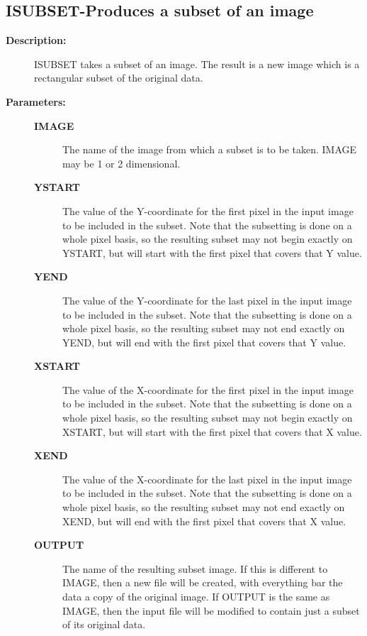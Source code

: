 \subsection{ISUBSET-\label{ISUBSET}Produces a subset of an image}
\begin{description}

\item [{\bf Description:}]
 ISUBSET takes a subset of an image.  The result is a new image
 which is a rectangular subset of the original data.

\item [{\bf Parameters:}]
\begin{description}
\item [{\bf IMAGE}]
 The name of the image from which a subset
 is to be taken.  IMAGE may be 1 or 2 dimensional.
\item [{\bf YSTART}]
 The value of the Y-coordinate for the first
 pixel in the input image to be included in the subset.
 Note that the subsetting is done on a whole pixel basis,
 so the resulting subset may not begin exactly on YSTART,
 but will start with the first pixel that covers that
 Y value.
\item [{\bf YEND}]
 The value of the Y-coordinate for the last
 pixel in the input image to be included in the subset.
 Note that the subsetting is done on a whole pixel basis,
 so the resulting subset may not end exactly on YEND,
 but will end with the first pixel that covers that
 Y value.
\item [{\bf XSTART}]
 The value of the X-coordinate for the first
 pixel in the input image to be included in the subset.
 Note that the subsetting is done on a whole pixel basis,
 so the resulting subset may not begin exactly on XSTART,
 but will start with the first pixel that covers that
 X value.
\item [{\bf XEND}]
 The value of the X-coordinate for the last
 pixel in the input image to be included in the subset.
 Note that the subsetting is done on a whole pixel basis,
 so the resulting subset may not end exactly on XEND,
 but will end with the first pixel that covers that
 X value.
\item [{\bf OUTPUT}]
 The name of the resulting subset image.  If
 this is different to IMAGE, then a new file will be
 created, with everything bar the data a copy of the
 original image.  If OUTPUT is the same as IMAGE, then
 the input file will be modified to contain just a subset
 of its original data.
\end{description}


\end{description}
